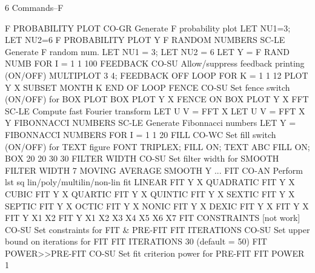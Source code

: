 6
Commands--F
 
F PROBABILITY PLOT          CO-GR Generate F probability plot
                                  LET NU1=3; LET NU2=6
                                  F PROBABILITY PLOT Y
F RANDOM NUMBERS            SC-LE Generate F random num.
                                  LET NU1 = 3; LET NU2 = 6
                                  LET Y = F RAND NUMB FOR I = 1 1 100
FEEDBACK                    CO-SU Allow/suppress feedback printing (ON/OFF)
                                  MULTIPLOT 3 4; FEEDBACK OFF
                                  LOOP FOR K = 1 1 12
                                  PLOT Y X SUBSET MONTH K
                                  END OF LOOP
FENCE                       CO-SU Set fence switch (ON/OFF) for BOX PLOT
                                  BOX PLOT Y X
                                  FENCE ON
                                  BOX PLOT Y X
FFT                         SC-LE Compute fast Fourier transform
                                  LET U V = FFT X
                                  LET U V = FFT X Y
FIBONNACCI NUMBERS          SC-LE Generate Fibonnacci numbers
                                  LET Y = FIBONNACCI NUMBERS FOR I = 1 1 20
FILL                        CO-WC Set fill switch (ON/OFF) for TEXT figure
                                  FONT TRIPLEX; FILL ON; TEXT ABC
                                  FILL ON; BOX 20 20 30 30
FILTER WIDTH                CO-SU Set filter width for SMOOTH
                                  FILTER WIDTH 7
                                  MOVING AVERAGE SMOOTH Y
... FIT                     CO-AN Perform lst sq lin/poly/multilin/non-lin fit
                                  LINEAR FIT Y X
                                  QUADRATIC FIT Y X
                                  CUBIC FIT Y X
                                  QUARTIC FIT Y X
                                  QUINTIC FIT Y X
                                  SEXTIC FIT Y X
                                  SEPTIC FIT Y X
                                  OCTIC FIT Y X
                                  NONIC FIT Y X
                                  DEXIC FIT Y X
                                  FIT Y X
                                  FIT Y X1 X2
                                  FIT Y X1 X2 X3 X4 X5 X6 X7
FIT CONSTRAINTS [not work]  CO-SU Set constraints for FIT & PRE-FIT
FIT ITERATIONS              CO-SU Set upper bound on iterations for FIT
                                  FIT ITERATIONS 30 (default = 50)
FIT POWER>>PRE-FIT          CO-SU Set fit criterion power for PRE-FIT
                                  FIT POWER 1
